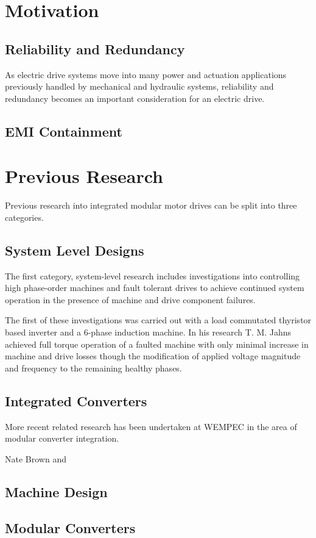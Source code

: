 \section{Motivation}


\subsection{Reliability and Redundancy}
As electric drive systems move into many power and actuation applications
previously handled by mechanical and hydraulic systems, reliability and
redundancy becomes an important consideration for an electric drive.



\subsection{EMI Containment}



\section{Previous Research}
Previous research into integrated modular motor drives can be split into three
categories.
\subsection{System Level Designs}
The first category, system-level research includes investigations into
controlling high phase-order machines and fault tolerant drives to achieve
continued system operation in the presence of machine and drive component
failures.

The first of these investigations was carried out with a load commutated
thyristor based inverter and a 6-phase induction machine.
In his research \cite{Jahns78} T. M. Jahns achieved full torque operation of a faulted
machine with only minimal increase in machine and drive losses though the
modification of applied voltage magnitude and frequency to the remaining
healthy phases.

\subsection{Integrated Converters}
More recent related research has been undertaken at WEMPEC in the area of
modular converter integration.

Nate Brown and 


\subsection{Machine Design}



\subsection{Modular Converters}
